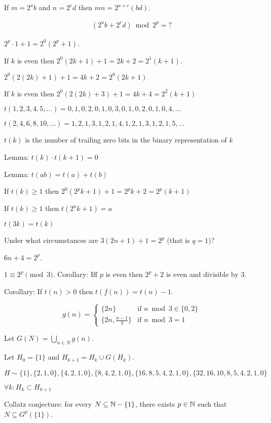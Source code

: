 If \(m = 2^a b\) and \(n = 2^c d\) then \(mn = 2^{a+c} (bd)\).

\begin{align*}
    (2^a b + 2^c d) \bmod 2^p = ?
\end{align*}

\(2^p \cdot 1 + 1 = 2^0 (2^p + 1)\).

If \(k\) is even then \(2^0 (2k + 1) + 1 = 2k + 2 = 2^1 (k+1)\).

\(2^0 (2(2k) + 1) + 1 = 4k+2 = 2^0(2k+1)\)

If \(k\) is even then \(2^0 (2(2k) + 3) + 1 = 4k+4 = 2^2(k+1)\)

\(t(1,2,3,4,5,\ldots) = 0,1,0,2,0,1,0,3,0,1,0,2,0,1,0,4,\ldots\)

\(t(2,4,6,8,10,\ldots) = 1,2,1,3,1,2,1,4,1,2,1,3,1,2,1,5,\ldots\)

\(t(k)\) is the number of trailing zero bits in the binary representation of \(k\)

Lemma: \(t(k) \cdot t(k+1) = 0\)

Lemma: \(t(ab) = t(a) + t(b)\)

If \(t(k) \ge 1\) then \(2^0 (2^p k+1) + 1 = 2^p k + 2 = 2^p (k+1)\)

If \(t(k) \ge 1\) then \(t(2^a k+1) = a\)

\(t(3k) = t(k)\)

Under what circumstances are \(3(2n+1)+1 = 2^p\) (that is \(q=1\))?

\(6n+4 = 2^p\).

\(1 \equiv 2^p \pmod 3\).
Corollary: Iff \(p\) is even then \(2^p+2\) is even and divisible by 3.

Corollary: If \(t(n) > 0\) then \(t(f(n)) = t(n)-1\).

\[
    g(n) =
    \begin{cases}
        \{2n\} & \text{if } n \bmod 3 \in \{0,2\}
        \\
        \{2n, \frac{n-1}{3}\} & \text{if } n \bmod 3 = 1
    \end{cases}
\]

Let \(G(N) = \bigcup_{n \in N} g(n)\).

Let \(H_0 = \{1\}\) and \(H_{k+1} = H_k \cup G(H_k)\).

\(H \sim \{1\}, \{2,1,0\}, \{4,2,1,0\}, \{8,4,2,1,0\}, \{16,8,5,4,2,1,0\}, \{32,16,10,8,5,4,2,1,0\}\)

\(\forall k : H_k \subset H_{k+1}\)

Collatz conjecture: for every \(N \subseteq \mathbb{N} - \{1\}\), there exists \(p \in \mathbb{N}\) such that \(N \subseteq G^p(\{1\})\).

